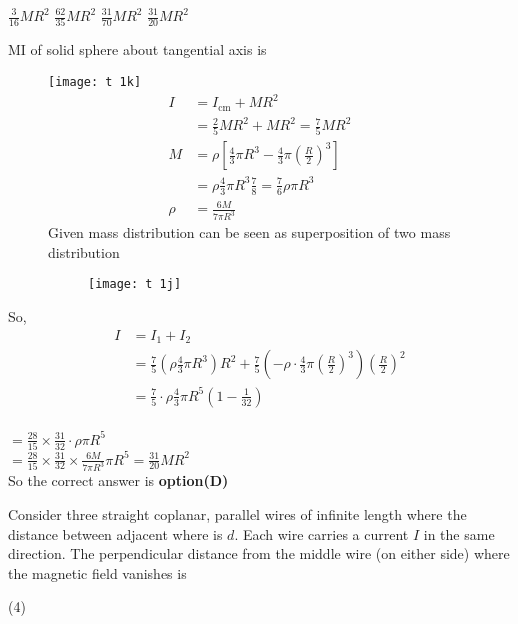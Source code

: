 \begin{questions}
\begin{tasks}
	\task[\textbf{A.}]   $\frac{3}{16} M R^{2}$
	\task[\textbf{B.}] $\frac{62}{35} M R^{2}$
	\task[\textbf{C.}] $\frac{31}{70} M R^{2}$
	\task[\textbf{D.}] $\frac{31}{20} M R^{2}$
\end{tasks}
\begin{answer}
	MI of solid sphere about tangential axis is
	\begin{figure}[H]
		\centering
		\texttt{[image: t 1k]}
	$$
	\begin{aligned}
	I &=I_{\mathrm{cm}}+M R^{2} \\
	&=\frac{2}{5} M R^{2}+M R^{2}=\frac{7}{5} M R^{2} \\
	M &=\rho\left[\frac{4}{3} \pi R^{3}-\frac{4}{3} \pi\left(\frac{R}{2}\right)^{3}\right] \\
	&=\rho \frac{4}{3} \pi R^{3} \frac{7}{8}=\frac{7}{6} \rho \pi R^{3} \\
	\rho &=\frac{6 M}{7 \pi R^{3}}
	\end{aligned}
	$$
	Given mass distribution can be seen as superposition of two mass distribution
	\begin{figure}[H]
		\centering
		\texttt{[image: t 1j]}
	\end{figure}
	\end{figure}
So,
$$
\begin{aligned}
I &=I_{1}+I_{2} \\
&=\frac{7}{5}\left(\rho \frac{4}{3} \pi R^{3}\right) R^{2}+\frac{7}{5}\left(-\rho \cdot \frac{4}{3} \pi\left(\frac{R}{2}\right)^{3}\right)\left(\frac{R}{2}\right)^{2} \\
&=\frac{7}{5} \cdot \rho \frac{4}{3} \pi R^{5}\left(1-\frac{1}{32}\right)
\end{aligned}
$$\\
$=\frac{28}{15} \times \frac{31}{32} \cdot \rho \pi R^{5}$\\
$=\frac{28}{15} \times \frac{31}{32} \times \frac{6 M}{7 \pi R^{3}} \pi R^{5}=\frac{31}{20} M R^{2}$\\
	So the correct answer is \textbf{option(D)}
\end{answer}
\begin{minipage}{\textwidth}
	\question Consider three straight coplanar, parallel wires of infinite length where the distance between adjacent where is $d$. Each wire carries a current $I$ in the same direction. The perpendicular distance from the middle wire (on either side) where the magnetic field vanishes is
\end{minipage}
\begin{tasks}(4)

\end{tasks}
\end{questions}

